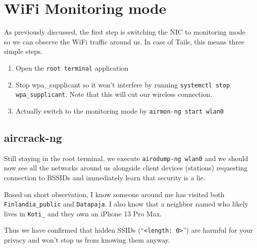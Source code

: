 \documentclass[../wifi-security.tex]{subfiles}
\begin{document}
\section{WiFi Monitoring mode}


As previously discussed, %
the first step is switching the NIC to monitoring mode so we can observe the WiFi traffic around us.
In case of Tails, this means three simple steps.

\begin{enumerate}
	\item Open the \texttt{root terminal} application
	\item Stop wpa\_supplicant so it won't interfere by running \texttt{systemctl stop wpa\_supplicant}. Note that this will cut our wireless connection.
	\item Actually switch to the monitoring mode by \texttt{airmon-ng start wlan0}
\end{enumerate}


\subsection{aircrack-ng}

Still staying in the root terminal, we execute \texttt{airodump-ng wlan0} and we should now see all the networks around us alongside client devices (stations) requesting connection to BSSIDs and immediately learn that security is a lie.

Based on short observation, I know someone around me has visited both \texttt{Finlandia\_public} and \texttt{Datapaja}. I also know that a neighbor named \Name who likely lives in \texttt{Koti\_\Name} and they own an iPhone 13 Pro Max.

Thus we have confirmed that hidden SSIDs (``\texttt{<length: 0>}'') are harmful for your privacy and won't stop us from knowing them anyway.

%
%
\end{document}
